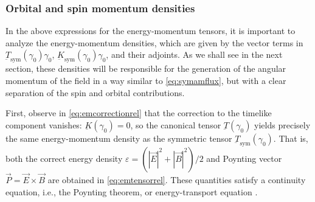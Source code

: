 \documentclass[1p,sort&compress]{elsarticle}
\numberwithin{equation}{section}
\newcommand{\rv}[1]{\vec{#1}}
\begin{document}

\subsubsection{Orbital and spin momentum densities}


In the above expressions for the energy-momentum tensors, it is important to analyze the energy-momentum densities, which are given by the vector terms in $\underbar{T}_{\text{sym}}(\gamma_0)\gamma_0$, $\underbar{K}_{\text{sym}}(\gamma_0)\gamma_0$, and their adjoints. As we shall see in the next section, these densities will be responsible for the generation of the angular momentum of the field in a way similar to \eqref{eq:symamflux}, but with a clear separation of the spin and orbital contributions.

First, observe in \eqref{eq:emcorrectionrel} that the correction to the timelike component vanishes: $\underbar{K}(\gamma_0) = 0$, so the canonical tensor $\underbar{T}(\gamma_0)$ yields precisely the same energy-momentum density as the symmetric tensor $\underbar{T}_{\text{sym}}(\gamma_0)$.  That is, both the correct energy density $\varepsilon = (|\rv{E}|^2 + |\rv{B}|^2)/2$ and Poynting vector $\rv{P} = \rv{E}\times\rv{B}$ are obtained in \eqref{eq:emtensorrel}.  These quantities satisfy a continuity equation, i.e., the Poynting theorem, or energy-transport equation \cite{Jackson1999}.
\end{document}
